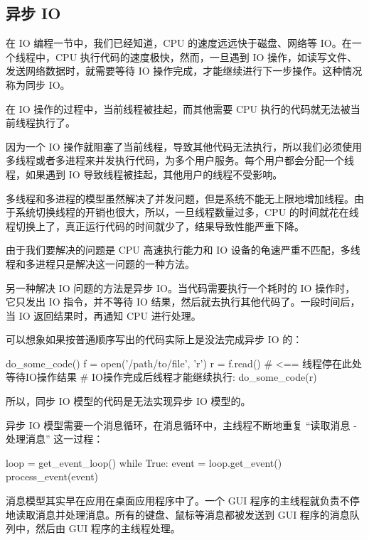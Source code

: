 \hypertarget{ux5f02ux6b65-io}{%
\subsection{异步 IO}\label{ux5f02ux6b65-io}}

在 IO 编程一节中，我们已经知道，CPU 的速度远远快于磁盘、网络等
IO。在一个线程中，CPU 执行代码的速度极快，然而，一旦遇到 IO
操作，如读写文件、发送网络数据时，就需要等待 IO
操作完成，才能继续进行下一步操作。这种情况称为同步 IO。

在 IO 操作的过程中，当前线程被挂起，而其他需要 CPU
执行的代码就无法被当前线程执行了。

因为一个 IO
操作就阻塞了当前线程，导致其他代码无法执行，所以我们必须使用多线程或者多进程来并发执行代码，为多个用户服务。每个用户都会分配一个线程，如果遇到
IO 导致线程被挂起，其他用户的线程不受影响。

多线程和多进程的模型虽然解决了并发问题，但是系统不能无上限地增加线程。由于系统切换线程的开销也很大，所以，一旦线程数量过多，CPU
的时间就花在线程切换上了，真正运行代码的时间就少了，结果导致性能严重下降。

由于我们要解决的问题是 CPU 高速执行能力和 IO
设备的龟速严重不匹配，多线程和多进程只是解决这一问题的一种方法。

另一种解决 IO 问题的方法是异步 IO。当代码需要执行一个耗时的 IO
操作时，它只发出 IO 指令，并不等待 IO
结果，然后就去执行其他代码了。一段时间后，当 IO 返回结果时，再通知 CPU
进行处理。

可以想象如果按普通顺序写出的代码实际上是没法完成异步 IO 的：

\begin{pythoncode}
do_some_code()
f = open('/path/to/file', 'r')
r = f.read() # <== 线程停在此处等待IO操作结果
# IO操作完成后线程才能继续执行:
do_some_code(r)
\end{pythoncode}

所以，同步 IO 模型的代码是无法实现异步 IO 模型的。

异步 IO 模型需要一个消息循环，在消息循环中，主线程不断地重复 ``读取消息
- 处理消息'' 这一过程：

\begin{pythoncode}
loop = get_event_loop()
while True:
    event = loop.get_event()
    process_event(event)
\end{pythoncode}

消息模型其实早在应用在桌面应用程序中了。一个 GUI
程序的主线程就负责不停地读取消息并处理消息。所有的键盘、鼠标等消息都被发送到
GUI 程序的消息队列中，然后由 GUI 程序的主线程处理。

